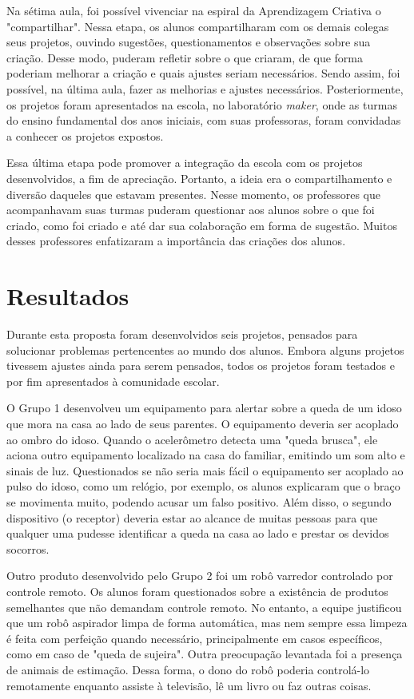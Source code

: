 \documentclass[portuguese]{textolivre}
\begin{document}
Na sétima aula, foi possível vivenciar na espiral da Aprendizagem Criativa o "compartilhar". Nessa etapa, os alunos compartilharam com os demais colegas seus projetos, ouvindo sugestões, questionamentos e observações sobre sua criação. Desse modo,  puderam refletir sobre o que criaram, de que forma poderiam melhorar a criação e quais ajustes seriam necessários. Sendo assim, foi possível, na última aula, fazer as melhorias e ajustes necessários. Posteriormente, os projetos foram apresentados na escola, no laboratório \textit{maker}, onde as turmas do ensino fundamental dos anos iniciais, com suas professoras, foram convidadas a conhecer os projetos expostos.

Essa última etapa pode promover a integração da escola com os projetos desenvolvidos, a fim de apreciação. Portanto, a ideia era o compartilhamento e diversão daqueles que estavam presentes. Nesse momento, os professores que acompanhavam suas turmas puderam questionar aos alunos sobre o que foi criado, como foi criado e até dar sua colaboração em forma de sugestão. Muitos desses professores enfatizaram a importância das criações dos alunos.

\section{Resultados}\label{sec:results}

Durante esta proposta foram desenvolvidos seis projetos, pensados para solucionar problemas pertencentes ao mundo dos alunos. Embora alguns projetos tivessem ajustes ainda para serem pensados, todos os projetos foram testados e por fim apresentados à comunidade escolar. 

O Grupo 1 desenvolveu um equipamento para alertar sobre a queda de um idoso que mora na casa ao lado de seus parentes. O equipamento deveria ser acoplado ao ombro do idoso. Quando o acelerômetro detecta uma "queda brusca", ele aciona outro equipamento localizado na casa do familiar, emitindo um som alto e sinais de luz. Questionados se não seria mais fácil o equipamento ser acoplado ao pulso do idoso, como um relógio, por exemplo, os alunos explicaram que o braço se movimenta muito, podendo acusar um falso positivo. Além disso, o segundo dispositivo (o receptor) deveria estar ao alcance de muitas pessoas para que qualquer uma pudesse identificar a queda na casa ao lado e prestar os devidos socorros.

Outro produto desenvolvido pelo Grupo 2 foi um robô varredor controlado por controle remoto. Os alunos foram questionados sobre a existência de produtos semelhantes que não demandam controle remoto. No entanto, a equipe justificou que um robô aspirador limpa de forma automática, mas nem sempre essa limpeza é feita com perfeição quando necessário, principalmente em casos específicos, como em caso de "queda de sujeira". Outra preocupação levantada foi a presença de animais de estimação. Dessa forma, o dono do robô poderia controlá-lo remotamente enquanto assiste à televisão, lê um livro ou faz outras coisas.
\end{document}
